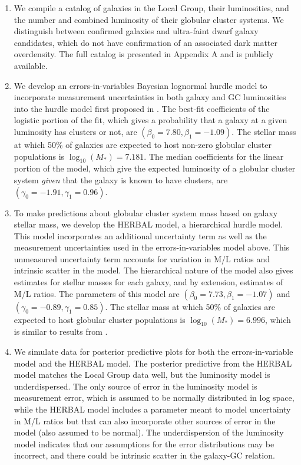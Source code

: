 \documentclass[twocolumn]{aastex631}
\begin{document}
\begin{enumerate}
    \item We compile a catalog of galaxies in the Local Group, their luminosities, and the number and combined luminosity of their globular cluster systems. We distinguish between confirmed galaxies and ultra-faint dwarf galaxy candidates, which do not have confirmation of an associated dark matter overdensity. The full catalog is presented in Appendix A and is publicly available. 
    \item We develop an errors-in-variables Bayesian lognormal hurdle model to incorporate measurement uncertainties in both galaxy and GC luminosities into the hurdle model first proposed in . The best-fit coefficients of the logistic portion of the fit, which gives a probability that a galaxy at a given luminosity has clusters or not, are $(\beta_0=7.80, \beta_1=-1.09)$. The stellar mass at which 50\% of galaxies are expected to host non-zero globular cluster populations is $\log_{10}(M_*)=7.181$. The median coefficients for the linear portion of the model, which give the expected luminosity of a globular cluster system \textit{given} that the galaxy is known to have clusters, are $(\gamma_0=-1.91, \gamma_1=0.96)$. 
    \item To make predictions about globular cluster system mass based on galaxy stellar mass, we develop the HERBAL model, a hierarchical hurdle model. This model incorporates an additional uncertainty term as well as the measurement uncertainties used in the errors-in-variables model above. This unmeasured uncertainty term accounts for variation in M/L ratios and intrinsic scatter in the model. The hierarchical nature of the model also gives estimates for stellar masses for each galaxy, and by extension, estimates of M/L ratios. The parameters of this model are $(\beta_0=7.73, \beta_1=-1.07)$ and $(\gamma_0=-0.89, \gamma_1=0.85)$. The stellar mass at which 50\% of galaxies are expected to host globular cluster populations is $\log_{10}(M_*)=6.996$, which is similar to results from \citep{Chen2023}.
    \item We simulate data for posterior predictive plots for both the errors-in-variable model and the HERBAL model. The posterior predictive from the HERBAL model matches the Local Group data well, but the luminosity model is underdispersed. The only source of error in the luminosity model is measurement error, which is assumed to be normally distributed in log space, while the HERBAL model includes a parameter meant to model uncertainty in M/L ratios but that can also incorporate other sources of error in the model (also assumed to be normal). The underdispersion of the luminosity model indicates that our assumptions for the error distributions may be incorrect, and there could be intrinsic scatter in the galaxy-GC relation. 

\end{enumerate}
\end{document}
